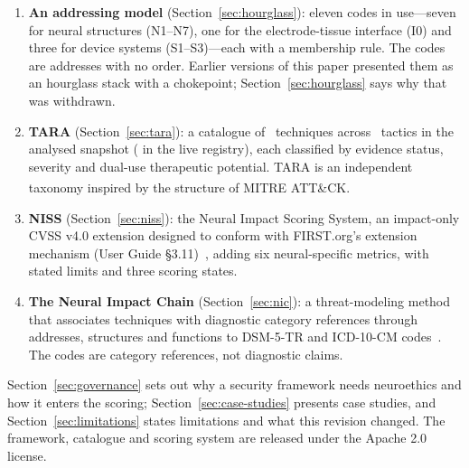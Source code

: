 \begin{enumerate}
  \item \textbf{An addressing model} (Section~\ref{sec:hourglass}): eleven codes in
        use---seven for neural structures (N1--N7), one for the electrode-tissue
        interface (I0) and three for device systems (S1--S3)---each with a membership
        rule. The codes are addresses with no order. Earlier versions of this paper
        presented them as an hourglass stack with a chokepoint; Section~\ref{sec:hourglass}
        says why that was withdrawn.

  \item \textbf{TARA} (Section~\ref{sec:tara}): a catalogue of
        \SnapshotTechniques{}~techniques across \SnapshotTactics{}~tactics in the analysed
        snapshot (\LiveTechniques{} in the live registry), each classified by evidence
        status, severity and dual-use therapeutic potential. TARA is an independent
        taxonomy inspired by the structure of MITRE ATT\&CK\textsuperscript{\textregistered}.

  \item \textbf{NISS} (Section~\ref{sec:niss}): the Neural Impact Scoring
        System, an impact-only CVSS v4.0 extension designed to conform with
        FIRST.org's extension mechanism (User Guide
        \S3.11)~\cite{first2023cvss4userguide}, adding six neural-specific
        metrics, with stated limits and three scoring states.

  \item \textbf{The Neural Impact Chain} (Section~\ref{sec:nic}): a threat-modeling
        method that associates techniques with diagnostic category references through
        addresses, structures and functions to DSM-5-TR and ICD-10-CM
        codes~\cite{apa2022dsm5tr}. The codes are category references, not
        diagnostic claims.
\end{enumerate}

Section~\ref{sec:governance} sets out why a security framework needs neuroethics and
how it enters the scoring; Section~\ref{sec:case-studies} presents case studies, and
Section~\ref{sec:limitations} states limitations and what this revision changed. The
framework, catalogue and scoring system are released under the Apache 2.0 license.
